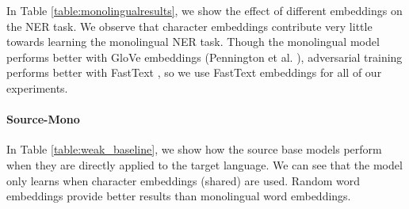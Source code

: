 \documentclass[letterpaper]{article} \usepackage{aaai20}  \usepackage{times}  \usepackage{helvet} \usepackage{courier}  \usepackage[hyphens]{url}  \usepackage{graphicx} \urlstyle{rm} \def\UrlFont{\rm}  \usepackage{graphicx}  \frenchspacing  \setlength{\pdfpagewidth}{8.5in}  \setlength{\pdfpageheight}{11in}
\begin{document}
 In Table \ref{table:monolingualresults}, we show the effect of different embeddings on the NER task.  We observe that character embeddings contribute very little towards learning the monolingual NER task. Though the monolingual model performs better with GloVe embeddings (Pennington et al. \citeyear{pennington-socher-manning:2014:EMNLP2014}), adversarial training performs better with FastText \cite{bojanowski2017enriching}, so we use FastText embeddings for all of our experiments.

 
 

\paragraph{Source-Mono}
In Table \ref{table:weak_baseline}, we show how the source base models perform when they are directly applied to the target language. We can see that the model only learns when character embeddings (shared) are used. Random word embeddings provide better results than monolingual word embeddings.  



\begin{table}[t!]
\centering
{}

\caption{\label{table:weak_baseline} 
Results for monolingual models applied to target language NER task. `x' means the model fails to learn anything.  and  scores are calculated by tuning on the development datasets of the target and source, respectively.  }
\end{table}
\end{document}

